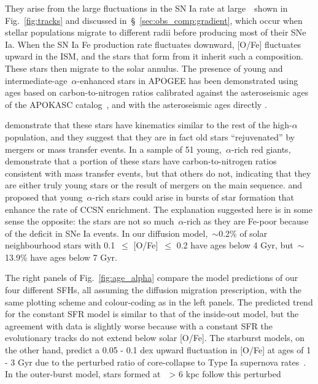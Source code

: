 \documentclass[draft2.tex]{subfiles}
\begin{document}
They arise from the large fluctuations in the SN Ia rate at large~\rgal~shown 
in Fig.~\ref{fig:tracks} and discussed in~\S~\ref{sec:obs_comp:gradient}, 
which occur when stellar populations migrate to different radii before 
producing most of their SNe Ia. 
When the SN Ia Fe production rate fluctuates downward, [O/Fe] fluctuates 
upward in the ISM, and the stars that form from it inherit such a composition. 
These stars then migrate to the solar annulus. 
The presence of young and intermediate-age~$\alpha$-enhanced stars in APOGEE 
has been demonstrated using ages based on carbon-to-nitrogen ratios 
\citep{Martig2016} calibrated against the asteroseismic ages of the APOKASC 
catalog~\citep{Pinsonneault2014}, and with the asteroseismic ages directly 
\citep{SilvaAguirre2018}. 
\par 
\citet{SilvaAguirre2018} demonstrate that these stars have kinematics similar 
to the rest of the high-$\alpha$ population, and they suggest that they are 
in fact old stars ``rejuvenated'' by mergers or mass transfer events. 
In a sample of 51 young,~$\alpha$-rich red giants,~\citet{Hekker2019} 
demonstrate that a portion of these stars have carbon-to-nitrogen ratios 
consistent with mass transfer events, but that others do not, indicating that 
they are either truly young stars or the result of mergers on the main 
sequence. 
\citet{Weinberg2017} and~\citet{Johnson2020} proposed that young~$\alpha$-rich 
stars could arise in bursts of star formation that enhance the rate of CCSN 
enrichment. The explanation suggested here is in some sense the opposite: the 
stars are not so much~$\alpha$-rich as they are Fe-poor because of the 
deficit in SNe Ia events. 
In our diffusion model,~$\sim$0.2\% of solar neighbourhood stars with 0.1~$\leq$ 
[O/Fe]~$\leq$ 0.2 have ages below 4 Gyr, but~$\sim$13.9\% have ages below 7 Gyr. 
\par 
The right panels of Fig.~\ref{fig:age_alpha} compare the model predictions of 
our four different SFHs, all assuming the diffusion migration prescription, 
with the same plotting scheme and colour-coding as in the left panels. 
The predicted trend for the constant SFR model is similar to that of the 
inside-out model, but the agreement with data is slightly worse because with a 
constant SFR the evolutionary tracks do not extend below solar [O/Fe]. 
The starburst models, on the other hand, predict a 0.05 - 0.1 dex upward 
fluctuation in [O/Fe] at ages of 1 - 3 Gyr due to the perturbed ratio of 
core-collapse to Type Ia supernova rates~\citep{Johnson2020}. 
In the outer-burst model, stars formed at~\rgal~> 6 kpc follow this perturbed 
\end{document}
